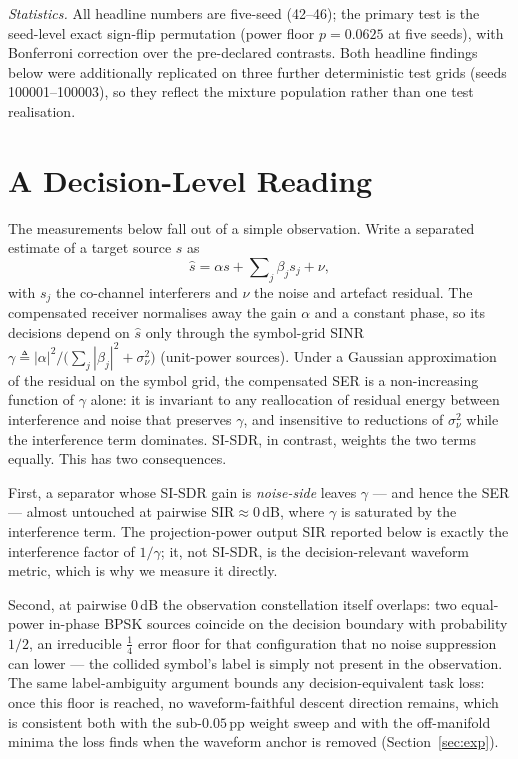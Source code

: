 \documentclass[journal]{IEEEtran}
\newcommand{\sir}{\mathrm{SIR}}
\begin{document}
\emph{Statistics.} All headline numbers are five-seed (42--46); the
primary test is the seed-level exact sign-flip permutation (power floor
$p = 0.0625$ at five seeds), with Bonferroni correction over the
pre-declared contrasts. Both headline findings below were additionally
replicated on three further deterministic test grids (seeds
100001--100003), so they reflect the mixture population rather than one
test realisation.

\section{A Decision-Level Reading}
\label{sec:reading}

The measurements below fall out of a simple observation. Write a
separated estimate of a target source $s$ as
\begin{equation}
  \hat{s} = \alpha s + \sum\nolimits_{j} \beta_j s_j + \nu ,
  \label{eq:decomp}
\end{equation}
with $s_j$ the co-channel interferers and $\nu$ the noise and artefact
residual. The compensated receiver normalises away the gain $\alpha$
and a constant phase, so its decisions depend on $\hat{s}$ only through
the symbol-grid SINR
$\gamma \triangleq |\alpha|^2 \big/
\big(\sum_j |\beta_j|^2 + \sigma_\nu^2\big)$ (unit-power sources).
Under a Gaussian approximation of the residual on the symbol grid, the
compensated SER is a non-increasing function of $\gamma$ alone: it is
invariant to any reallocation of residual energy between interference
and noise that preserves $\gamma$, and insensitive to reductions of
$\sigma_\nu^2$ while the interference term dominates. SI-SDR, in
contrast, weights the two terms equally. This has two consequences.

First, a separator whose SI-SDR gain is \emph{noise-side} leaves
$\gamma$ --- and hence the SER --- almost untouched at pairwise
$\sir \approx 0$\,dB, where $\gamma$ is saturated by the interference
term. The projection-power output SIR reported below is exactly the
interference factor of $1/\gamma$; it, not SI-SDR, is the
decision-relevant waveform metric, which is why we measure it directly.

Second, at pairwise $0$\,dB the observation constellation itself
overlaps: two equal-power in-phase BPSK sources coincide on the
decision boundary with probability $1/2$, an irreducible
$\tfrac{1}{4}$ error floor for that configuration that no noise
suppression can lower --- the collided symbol's label is simply not
present in the observation. The same label-ambiguity argument bounds
any decision-equivalent task loss: once this floor is reached, no
waveform-faithful descent direction remains, which is consistent both
with the sub-$0.05$\,pp weight sweep and with the off-manifold minima
the loss finds when the waveform anchor is removed
(Section~\ref{sec:exp}).
\end{document}
